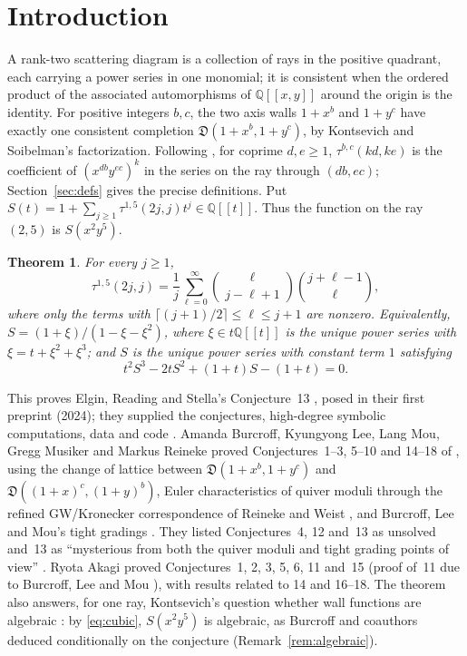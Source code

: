 \documentclass[11pt]{article}
\newtheorem{theorem}{Theorem}[section]
\theoremstyle{definition}
\theoremstyle{remark}
\numberwithin{equation}{section}
\newcommand{\Q}{\mathbb{Q}}
\newcommand{\ps}[1]{\Q[\![#1]\!]}
\begin{document}
\section{Introduction}\label{sec:intro}
A rank-two scattering diagram is a collection of rays in the positive
quadrant, each carrying a power series in one monomial; it is consistent
when the ordered product of the associated automorphisms of $\ps{x,y}$
around the origin is the identity. For positive integers $b,c$, the two
axis walls $1+x^b$ and $1+y^c$ have exactly one consistent completion
$\mathfrak D(1+x^b,1+y^c)$, by Kontsevich and Soibelman's factorization.
Following \cite[(2.2)]{BLMMR}, for coprime $d,e\geq1$, $\tau^{b,c}(kd,ke)$
is the coefficient of $(x^{db}y^{ec})^k$ in the series on the ray through
$(db,ec)$; Section~\ref{sec:defs} gives the precise definitions.
Put $S(t)=1+\sum_{j\geq1}\tau^{1,5}(2j,j)t^j\in\ps{t}$.
Thus the function on the ray $(2,5)$ is $S(x^2y^5)$.
\begin{theorem}\label{thm:main}
For every $j\geq1$,
\begin{equation}\label{eq:ers}
  \tau^{1,5}(2j,j)=\frac1j\sum_{\ell=0}^{\infty}\binom{\ell}{j-\ell+1}\binom{j+\ell-1}{\ell},
\end{equation}
where only the terms with $\lceil (j+1)/2\rceil\leq\ell\leq j+1$ are
nonzero. Equivalently, $S=(1+\xi)/(1-\xi-\xi^2)$, where
$\xi\in t\ps{t}$ is the unique power series with $\xi=t+\xi^2+\xi^3$; and
$S$ is the unique power series with constant term $1$ satisfying
\begin{equation}\label{eq:cubic}
  t^2S^3-2tS^2+(1+t)S-(1+t)=0 .
\end{equation}
\end{theorem}

This proves Elgin, Reading and Stella's Conjecture~13
\cite[Conjecture~13]{ERS}, posed in their first preprint (2024); they
supplied the conjectures, high-degree symbolic computations, data and
code \cite{scatcoef}. Amanda Burcroff, Kyungyong Lee, Lang Mou, Gregg
Musiker and Markus Reineke \cite[Theorem~1.4]{BLMMR} proved Conjectures~1--3, 5--10 and
14--18 of \cite{ERS}, using the change of lattice between
$\mathfrak{D}(1+x^b,1+y^c)$ and $\mathfrak{D}((1+x)^c,(1+y)^b)$,
Euler characteristics of quiver moduli through
the refined GW/Kronecker correspondence of Reineke and Weist \cite{RW},
and Burcroff, Lee and Mou's tight gradings \cite{BLM,BLM25}. They listed
Conjectures~4, 12 and~13 as unsolved and~13 as ``mysterious from both
the quiver moduli and tight grading points of view'' \cite[\S1.3]{BLMMR}. Ryota Akagi \cite[Proposition~1.3]{Akagi} proved Conjectures~1, 2, 3, 5, 6, 11 and~15 (proof of~11 due to Burcroff, Lee and Mou \cite[Remark~1.4]{Akagi}), with results related to 14 and 16--18.
The theorem also answers, for one ray, Kontsevich's question whether
wall functions are algebraic \cite[\S1.4]{GP10}: by \eqref{eq:cubic},
$S(x^2y^5)$ is algebraic, as Burcroff and coauthors deduced conditionally
on the conjecture \cite[\S9.3]{BLMMR} (Remark~\ref{rem:algebraic}).
\end{document}
